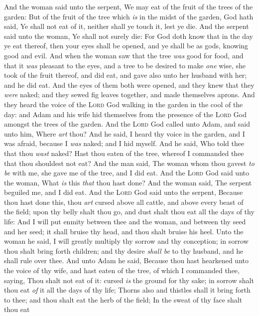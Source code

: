 \documentclass[11pt,letterpaper,oneside]{memoir}
\begin{document}
And the woman said unto the serpent, We may eat of the fruit of the
trees of the garden: But of the fruit of the tree which \emph{is} in the
midst of the garden, God hath said, Ye shall not eat of it, neither
shall ye touch it, lest ye die. And the serpent said unto the woman, Ye
shall not surely die: For God doth know that in the day ye eat thereof,
then your eyes shall be opened, and ye shall be as gods, knowing good
and evil. And when the woman saw that the tree \emph{was} good for food,
and that it \emph{was} pleasant to the eyes, and a tree to be desired to
make \emph{one} wise, she took of the fruit thereof, and did eat, and
gave also unto her husband with her; and he did eat. And the eyes of
them both were opened, and they knew that they \emph{were} naked; and
they sewed fig leaves together, and made themselves aprons. And they
heard the voice of the \textsc{Lord} God walking in the garden in the cool
of the day: and Adam and his wife hid themselves from the presence of
the \textsc{Lord} God amongst the trees of the garden. And the \textsc{Lord}
God called unto Adam, and said unto him, Where \emph{art} thou? And he
said, I heard thy voice in the garden, and I was afraid, because I
\emph{was} naked; and I hid myself. And he said, Who told thee that thou
\emph{wast} naked? Hast thou eaten of the tree, whereof I commanded thee
that thou shouldest not eat? And the man said, The woman whom thou
gavest \emph{to be} with me, she gave me of the tree, and I did eat. And
the \textsc{Lord} God said unto the woman, What \emph{is} this \emph{that}
thou hast done? And the woman said, The serpent beguiled me, and I did
eat. And the \textsc{Lord} God said unto the serpent, Because thou hast
done this, thou \emph{art} cursed above all cattle, and above every
beast of the field; upon thy belly shalt thou go, and dust shalt thou
eat all the days of thy life: And I will put enmity between thee and the
woman, and between thy seed and her seed; it shall bruise thy head, and
thou shalt bruise his heel. Unto the woman he said, I will greatly
multiply thy sorrow and thy conception; in sorrow thou shalt bring forth
children; and thy desire \emph{shall be} to thy husband, and he shall
rule over thee. And unto Adam he said, Because thou hast hearkened unto
the voice of thy wife, and hast eaten of the tree, of which I commanded
thee, saying, Thou shalt not eat of it: cursed \emph{is} the ground for
thy sake; in sorrow shalt thou eat \emph{of} it all the days of thy
life; Thorns also and thistles shall it bring forth to thee; and thou
shalt eat the herb of the field; In the sweat of thy face shalt thou eat
\end{document}
